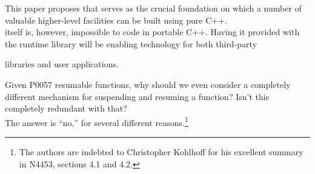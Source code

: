 This paper proposes \ectx that serves as the crucial foundation on which a
number of valuable higher-level facilities can be built using pure C++.\\
\newline
\ectx itself is, however, impossible to code in portable C++. Having it provided
with the runtime library will be enabling technology for both third-party

libraries and user applications.

Given P0057 resumable functions, why should we even consider a completely
different mechanism for suspending and resuming a function? Isn't this
completely redundant with that?\\
\newline
The answer is ``no,'' for several different reasons.\footnote{The authors are
indebted to Christopher Kohlhoff for his excellent summary in
N4453,\cite{N4453} sections 4.1 and 4.2.}


